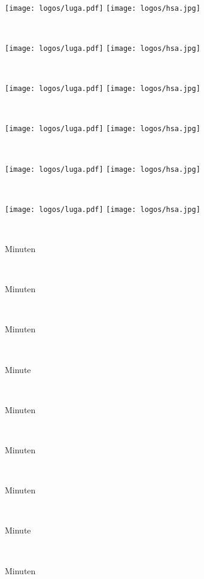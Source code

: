 \documentclass[a4paper,ngerman,landscape,30pt]{scrartcl}
\begin{document}
\newcommand{\page}[2]{
  \
  \begin{center}
    \vfill%
    \Huge\sffamily%
    \textbf{\scalebox{#1}{#2}}%
    \vfill
    \texttt{[image: logos/luga.pdf]}\quad
    \texttt{[image: logos/hsa.jpg]}
    \vfill
  \end{center}
  \newpage
}

\newcommand{\timeoutpage}[1]{
  \
  \begin{center}
    \vfill%
    \Huge\sffamily%
    \textbf{\scalebox{7}{#1}}%
    \vfill
    Minuten
    \vfill
  \end{center}
  \newpage
}

\newcommand{\timeoutpages}{
  \
  \begin{center}
    \vfill%
    \Huge\sffamily%
    \textbf{\scalebox{7}{1}}%
    \vfill
    Minute
    \vfill
  \end{center}
  \newpage
}

\page{2.4}{Raum A}
\page{2.4}{Raum B}
\page{2.4}{Raum C}
\page{2.4}{Raum D}
\page{2.4}{Raum E}
\page{2.4}{Raum F}

\timeoutpage{15}
\timeoutpage{8}
\timeoutpage{4}
\timeoutpages

\timeoutpage{4}
\timeoutpage{3}
\timeoutpage{2}
\timeoutpages
\timeoutpage{0}
\end{document}
